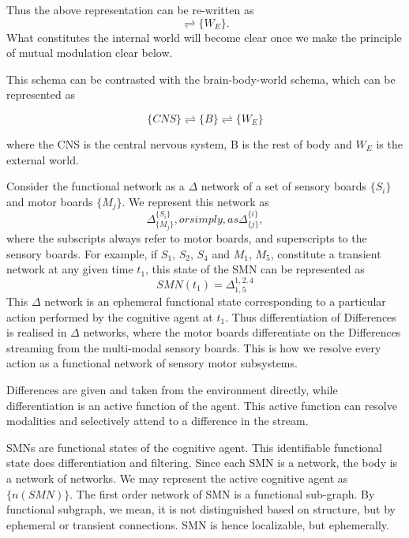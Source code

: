 Thus the above representation can be re-written as 
\begin{equation}
[\{n(SMN)\}_i\rightleftharpoons \{n(SMN)\}_j]\rightleftharpoons \{W_E\}.
\end{equation}
What constitutes the internal world will become clear once we make the principle of mutual modulation clear below.


This schema can be contrasted with the brain-body-world schema, which can be represented as 

\begin{equation}
\{CNS\}\rightleftharpoons\{B\}\rightleftharpoons\{W_E\}
\end{equation}

where the CNS is the central nervous system, B is the rest of body and $W_E$ is the external world.

Consider the functional network as a $\Delta$ network of a set of sensory boards $\{S_i\}$ and motor boards $\{M_j\}$. We represent this network as \begin{equation}\label{delta_notation}\Delta^{\{S_i\}}_{\{M_j\}}, or simply, as  \Delta^{\{i\}}_{\{j\}},\end{equation} where the subscripts always refer to motor boards, and superscripts to the sensory boards. For example, if $S_1$, $S_2$, $S_4$ and $M_1$, $M_5$, constitute a transient network at any given time $t_1$, this state of the SMN can be represented as 
\begin{equation}\label{delta_eg}SMN(t_1) = \Delta^{1,2,4}_{1,5}\end{equation} This $\Delta$ network is an ephemeral functional state corresponding to a particular action performed by the cognitive agent at $t_1$. Thus differentiation of Differences is realised in $\Delta$ networks, where the motor boards differentiate on the Differences streaming from the multi-modal sensory boards. This is how we resolve every action as a functional network of sensory motor subsystems.

Differences are given and taken from the environment directly, while differentiation is an active function of the agent. This active function can resolve modalities and selectively attend to a difference in the stream.

SMNs are functional states of the cognitive agent. This identifiable functional state does differentiation and filtering. Since each SMN is a network, the body is a network of networks. We may represent the active cognitive agent as $\{n(SMN)\}$. The first order network of SMN is a functional sub-graph. By functional subgraph, we mean, it is not distinguished based on structure, but by ephemeral or transient connections. SMN is hence localizable, but ephemerally.


